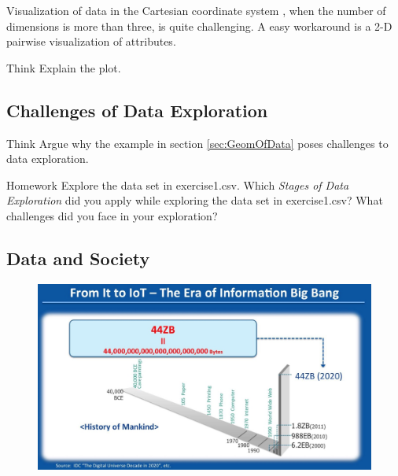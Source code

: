 \documentclass[12pt]{book}\usepackage{knitr}
\begin{document}
\noindent Visualization of data in the Cartesian coordinate system , when the number of dimensions is more than three, is quite challenging. A easy workaround is a 2-D pairwise visualization of attributes. 

\begin{DIY}{Think}
Explain the plot.
\end{DIY}
\subsection{Challenges of Data Exploration}
\begin{HIGHLIGHT}
\par{}
\end{HIGHLIGHT}

\begin{DIY}{Think}
Argue why the example in section \ref{sec:GeomOfData} poses challenges to data exploration.
\end{DIY}

\begin{DIY}{Homework}
Explore the data set in exercise1.csv.
Which \emph{Stages of Data Exploration} did you apply while exploring the data set in exercise1.csv?
What challenges did you face in your exploration?
\end{DIY}
\newpage
\subsection{Data and Society}
\begin{figure}[ht]
 \centering
    \includegraphics[width = 15 cm]{./viz/ext/DataVolumesVSHumanHistory.jpeg}
\end{figure}
\end{document}
